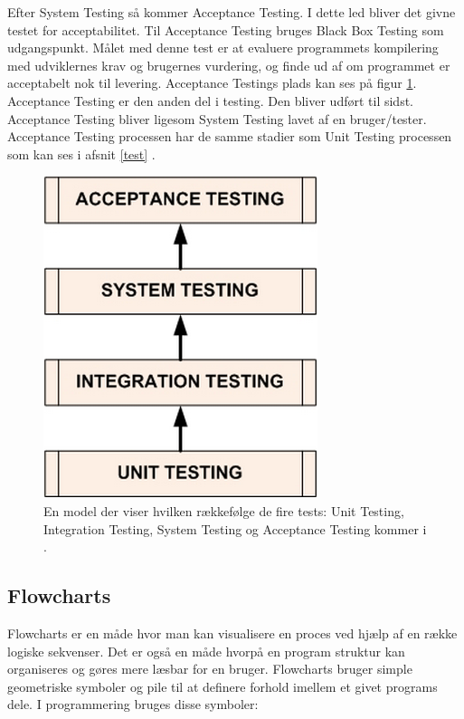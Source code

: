 Efter System Testing så kommer Acceptance Testing. I dette led bliver det givne testet for acceptabilitet. Til Acceptance Testing bruges Black Box Testing som udgangspunkt. Målet med denne test er at evaluere programmets kompilering med udviklernes krav og brugernes vurdering, og finde ud af om programmet er acceptabelt nok til levering. Acceptance Testings plads kan ses på figur \ref{fig:test1}. Acceptance Testing er den anden del i testing. Den bliver udført til sidst. Acceptance Testing bliver ligesom System Testing lavet af en bruger/tester. Acceptance Testing processen har de samme stadier som Unit Testing processen som kan ses i afsnit \ref{test} \citep{Fundamentals2011Acceptance}.

\begin{figure}[H]
\centering
\includegraphics[scale=0.5]{figures/test1.PNG}
\caption{En model der viser hvilken rækkefølge de fire tests: Unit Testing, Integration Testing, System Testing og Acceptance Testing kommer i \citep{Fundamentals2011Testing}.}
\label{fig:test1}
\end{figure}

\subsection{Flowcharts}

Flowcharts er en måde hvor man kan visualisere en proces ved hjælp af en række logiske sekvenser. Det er også en måde hvorpå en program struktur kan organiseres og gøres mere læsbar for en bruger. Flowcharts bruger simple geometriske symboler og pile til at definere forhold imellem et givet programs dele. I programmering bruges disse symboler:

